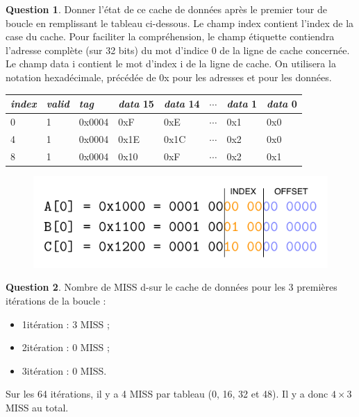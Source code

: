 \documentclass[11pt,english,french]{scrreprt}
\theoremstyle{remark}
\theoremstyle{definition}
\newtheorem{ques}{Question}[section]
\begin{document}
\begin{ques}
	Donner l'état de ce cache de données après le premier tour de boucle en remplissant le tableau ci-dessous. Le champ index contient l'index de la case du cache. Pour faciliter la compréhension, le champ étiquette contiendra l'adresse complète (sur 32 bits) du mot d'indice 0 de la ligne de cache concernée. Le champ data i contient le mot d'index i de la ligne de cache. On utilisera la notation hexadécimale, précédée de 0x pour les adresses et pour les données.
	
	\begin{tabularx}{\textwidth}{lllllXll}
		\toprule
		\emph{index} & \emph{valid} & \emph{tag} & \emph{data} 15 & \emph{data} 14 & $\cdots$ & \emph{data} 1 & \emph{data} 0\tabularnewline
		\midrule
		\midrule
		0 & 1 & 0x0004 & 0xF & 0xE & $\cdots$ & 0x1 & 0x0\tabularnewline
		\midrule
		4 & 1 & 0x0004 & 0x1E & 0x1C & $\cdots$ & 0x2 & 0x0\tabularnewline
		\midrule
		8 & 1 & 0x0004 & 0x10 & 0xF & $\cdots$ & 0x2 & 0x1\tabularnewline
		\bottomrule
	\end{tabularx}
	\begin{figure}[h]
		\center
		\includegraphics[scale=.9]{diagrammes/index-offset}
	\end{figure}
\end{ques}

\begin{ques}
	Nombre de MISS d-sur le cache de données pour les 3 premières itérations de la boucle : \begin{itemize}
		\item 1\iere itération : 3 MISS ;
		\item 2\ieme itération : 0 MISS ;
		\item 3\ieme itération : 0 MISS.
	\end{itemize}
	
	Sur les 64 itérations, il y a 4 MISS par tableau (0, 16, 32 et 48). Il y a donc $4\times 3$ MISS au total.
\end{ques}
\end{document}
